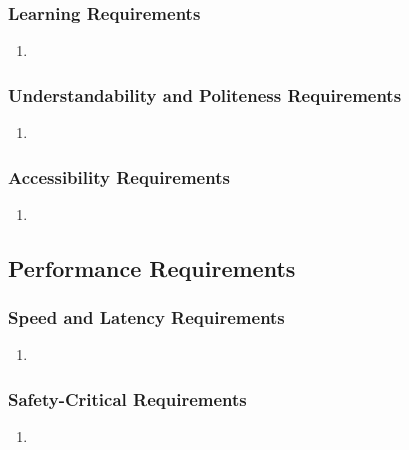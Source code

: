 \documentclass[]{article}
\begin{document}
\subsubsection{Learning Requirements}
\label{ssub:learning_requirements}
\begin{enumerate}[{UH}1. ]
	\item 
\end{enumerate}

\subsubsection{Understandability and Politeness Requirements}
\label{ssub:understandability_and_politeness_requirements}
\begin{enumerate}[{UH}1. ]
	\item 
\end{enumerate}

\subsubsection{Accessibility Requirements}
\label{ssub:accessibility_requirements}
\begin{enumerate}[{UH}1. ]
	\item 
\end{enumerate}


\subsection{Performance Requirements}
\label{sub:performance_requirements}

\subsubsection{Speed and Latency Requirements}
\label{ssub:speed_and_latency_requirements}
\begin{enumerate}[{PR}1. ]
	\item 
\end{enumerate}

\subsubsection{Safety-Critical Requirements}
\label{ssub:safety_critical_requirements}
\begin{enumerate}[{PR}1. ]
	\item 
\end{enumerate}
\end{document}
